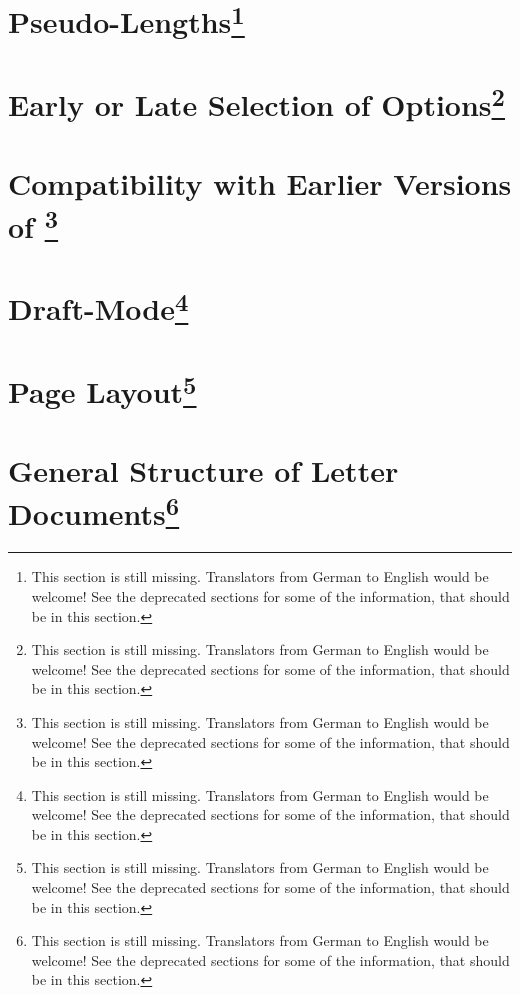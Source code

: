\section{Pseudo-Lengths\protect\footnote{This section is still missing. Translators
    from German to English would be welcome! See the deprecated sections for
    some of the information, that should be in this section.}}
\label{sec:scrlttr2.stillmissing}
\mbox{}

\section{Early or Late Selection of Options\protect\footnote{This section is still missing. Translators
    from German to English would be welcome! See the deprecated sections for
    some of the information, that should be in this section.}}
\label{sec:scrlttr2.stillmissing}
\mbox{}

\section{Compatibility with Earlier Versions of \KOMAScript{}\protect\footnote{This section is still missing. Translators
    from German to English would be welcome! See the deprecated sections for
    some of the information, that should be in this section.}}
\label{sec:scrlttr2.stillmissing}
\mbox{}

\section{Draft-Mode\protect\footnote{This section is still missing. Translators
    from German to English would be welcome! See the deprecated sections for
    some of the information, that should be in this section.}}
\label{sec:scrlttr2.stillmissing}
\mbox{}

\section{Page Layout\protect\footnote{This section is still missing. Translators
    from German to English would be welcome! See the deprecated sections for
    some of the information, that should be in this section.}}
\label{sec:scrlttr2.stillmissing}
\mbox{}

\section{General Structure of Letter Documents\protect\footnote{This section is still missing. Translators
    from German to English would be welcome! See the deprecated sections for
    some of the information, that should be in this section.}}
\label{sec:scrlttr2.stillmissing}
\mbox{}


